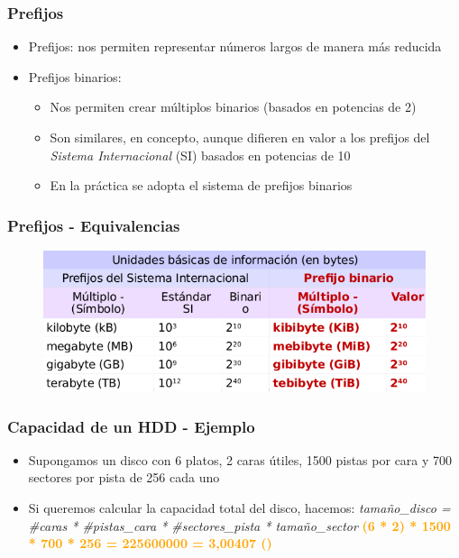 \begin{frame}
  \frametitle{Prefijos}
  \begin{itemize}
    \item Prefijos: nos permiten representar números largos de manera más reducida
    \item Prefijos binarios: 
    \begin{itemize}
      \item Nos permiten crear múltiplos binarios (basados en potencias de 2)
      \item Son similares, en concepto, aunque difieren en valor a los prefijos del \emph{Sistema Internacional} (SI) basados en potencias de 10
      \item En la práctica se adopta el sistema de prefijos binarios
    \end{itemize}  
  \end{itemize}
\end{frame}

\begin{frame}
  \frametitle{Prefijos - \textbf{Equivalencias}}
  \begin{figure}
      \includegraphics[scale=0.5]{images/si.png}
  \end{figure}
\end{frame}

\begin{frame}
  \frametitle{Capacidad de un \textbf{HDD} - Ejemplo}
  \begin{itemize}
    \item Supongamos un disco con 6 platos, 2 caras útiles, 1500 pistas por cara y 700 sectores por pista de 256 \bytes cada uno
    \item Si queremos calcular la capacidad total del disco, hacemos:
    \linebreak
    \linebreak
    \emph{tamaño\_disco = \#caras * \#pistas\_cara * \#sectores\_pista * tamaño\_sector}
    \linebreak
    \linebreak
    \textcolor{orange}{\textbf{(6 * 2) * 1500 * 700 * 256 \bytes = 225600000 \bytes = 3,00407 \gibishort\bytesshort (\gibi\bytes)}}
  \end{itemize}
\end{frame}

